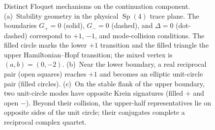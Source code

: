 \begin{figure}[t]
\caption{\label{fig:floquet}Distinct Floquet mechanisms on the continuation
component. (a)~Stability geometry in the physical $\operatorname{Sp}(4)$ trace
plane. The boundaries $G_+=0$ (solid), $G_-=0$ (dashed), and $\Delta=0$
(dot-dashed) correspond to $+1$, $-1$, and mode-collision conditions. The
filled circle marks the lower $+1$ transition and the filled triangle the upper
Hamiltonian--Hopf transition; the mixed vertex is $(a,b)=(0,-2)$.
(b)~Near the lower boundary, a real reciprocal pair (open squares) reaches
$+1$ and becomes an elliptic unit-circle pair (filled circles).
(c)~On the stable flank of the upper boundary, two unit-circle modes have
opposite Krein signatures (filled $+$ and open $-$). Beyond their collision,
the upper-half representatives lie on opposite sides of the unit circle; their
conjugates complete a reciprocal complex quartet.}
\end{figure}
